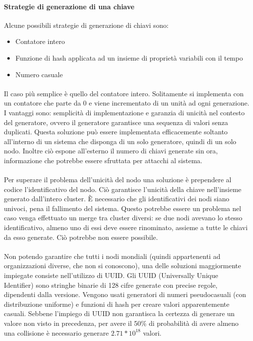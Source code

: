 \documentclass{article}
\begin{document}
\paragraph{Strategie di generazione di una chiave} Alcune possibili strategie di generazione di chiavi sono: \begin{itemize}
	\item Contatore intero
	\item Funzione di hash applicata ad un insieme di proprietà variabili con il tempo
	\item Numero casuale
\end{itemize}

\paragraph{} Il caso più semplice è quello del contatore intero. Solitamente si implementa con un contatore che parte da 0 e viene incrementato di un unità ad ogni generazione. I vantaggi sono: semplicità di implementazione e garanzia di unicità nel contesto del generatore, ovvero il generatore garantisce una sequenza di valori senza duplicati. Questa soluzione può essere implementata efficacemente soltanto all'interno di un sistema che disponga di un solo generatore, quindi di un solo nodo. Inoltre ciò espone all'esterno il numero di chiavi generate sin ora, informazione che potrebbe essere sfruttata per attacchi al sistema. 

\paragraph{} Per superare il problema dell'unicità del nodo una soluzione è prependere al codice l'identificativo del nodo. Ciò garantisce l'unicità della chiave nell'insieme generato dall'intero cluster. È necessario che gli identificativi dei nodi siano univoci, pena il fallimento del sistema. Questo potrebbe essere un problema nel caso venga effettuato un merge tra cluster diversi: se due nodi avevano lo stesso identificativo, almeno uno di essi deve essere rinominato, assieme a tutte le chiavi da esso generate. Ciò potrebbe non essere possibile.  

\paragraph{} Non potendo garantire che tutti i nodi mondiali (quindi appartenenti ad organizzazioni diverse, che non si conoscono), una delle soluzioni maggiormente impiegate consiste nell'utilizzo di UUID. Gli UUID (Universally Unique Identifier) sono stringhe binarie di 128 cifre generate con precise regole, dipendenti dalla versione. Vengono usati generatori di numeri pseudocasuali (con distribuzione uniforme) e funzioni di hash per creare valori apparentemente casuali. Sebbene l'impiego di UUID non garantisca la certezza di generare un valore non visto in precedenza, per avere il 50\% di probabilità di avere almeno una collisione è necessario generare $2.71*10^18$ valori.
\end{document}
